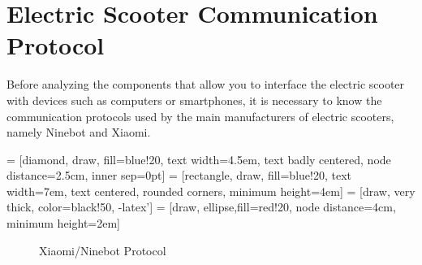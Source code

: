 \documentclass[binding=0.6cm,LaM,noexaminfo]{sapthesis}
\begin{document}
\section{Electric Scooter Communication Protocol}
\noindent Before analyzing the components that allow you to interface the electric scooter with devices such as computers or smartphones, it is necessary to know the communication protocols used by the main manufacturers of electric scooters, namely Ninebot and Xiaomi.

 = [diamond, draw, fill=blue!20,
    text width=4.5em, text badly centered, node distance=2.5cm, inner sep=0pt]
 = [rectangle, draw, fill=blue!20,
    text width=7em, text centered, rounded corners, minimum height=4em]
 = [draw, very thick, color=black!50, -latex']
 = [draw, ellipse,fill=red!20, node distance=4cm,
    minimum height=2em]
    


\begin{figure}[!htp]
    \centering
    \caption{Xiaomi/Ninebot Protocol}
    \label{fig:protocol_1}
\end{figure}
\end{document}
